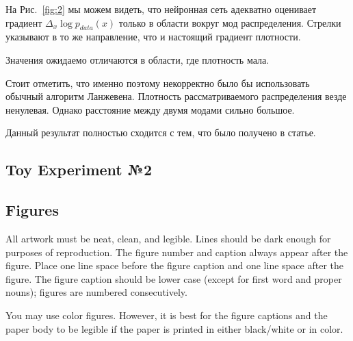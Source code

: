 \documentclass{article}
\begin{document}
На Рис.~\ref{fig:2} мы можем видеть, что нейронная сеть адекватно оценивает
градиент $\Delta_x \log p_{data}(x)$ только в области вокруг мод распределения.
Стрелки указывают в то же направление, что и настоящий градиент плотности.

Значения ожидаемо отличаются в области, где плотность мала.

Стоит отметить, что именно поэтому некорректно было бы использовать обычный
алгоритм Ланжевена. Плотность рассматриваемого распределения везде ненулевая.
Однако расстояние между двумя модами сильно большое.

Данный результат полностью сходится с тем, что было получено в статье.

\subsection{Toy Experiment №2}










\subsection{Figures}


All artwork must be neat, clean, and legible. Lines should be dark enough for
purposes of reproduction. The figure number and caption always appear after the
figure. Place one line space before the figure caption and one line space after
the figure. The figure caption should be lower case (except for first word and
proper nouns); figures are numbered consecutively.

You may use color figures.  However, it is best for the figure captions and the
paper body to be legible if the paper is printed in either black/white or in
color.



 
 
\end{document}
